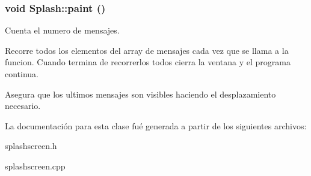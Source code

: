 \subsubsection{\setlength{\rightskip}{0pt plus 5cm}void Splash::paint ()\hspace{0.3cm}{\tt  [slot]}}\label{classSplash_i1}


Cuenta el numero de mensajes.

Recorre todos los elementos del array de mensajes cada vez que se llama a la funcion. Cuando termina de recorrerlos todos cierra la ventana y el programa continua.

Asegura que los ultimos mensajes son visibles haciendo el desplazamiento necesario. 

La documentaci\'{o}n para esta clase fu\'{e} generada a partir de los siguientes archivos:\begin{CompactItemize}
\item 
splashscreen.h\item 
splashscreen.cpp\end{CompactItemize}
